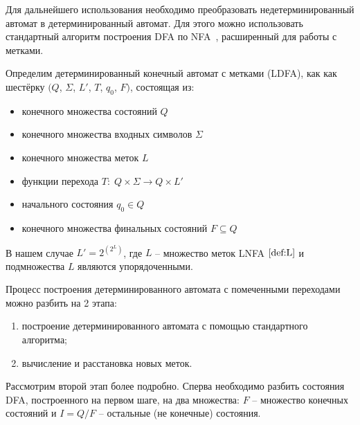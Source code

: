 Для дальнейшего использования необходимо преобразовать недетерминированный автомат в детерминированный автомат. Для этого можно использовать стандартный алгоритм построения DFA по NFA~\cite{DrgBook}, расширенный для работы с метками.

Определим детерминированный конечный автомат с метками (LDFA), как как шестёрку $(Q$, $\Sigma$, $L'$, $T$, $q_0$, $F)$, состоящая из:
\begin{itemize}
	\item конечного множества состояний $Q$ 
	\item конечного множества входных символов $\Sigma$ 
	\item конечного множества меток $L$ 
	\item функции перехода $T: \; Q \times \Sigma \rightarrow Q \times L'$
	\item начального состояния $q_0 \in Q$
	\item конечного множества финальных состояний $F \subseteq Q$ 
\end{itemize}

В нашем случае $L' = 2^{(2^L)}$, где $L$ -- множество меток LNFA $\eqref{def:L}$ и подмножества $L$ являются упорядоченными.

Процесс построения детерминированного автомата с помеченными переходами можно разбить на 2 этапа:
\begin{enumerate}
	\item построение детерминированного автомата с помощью стандартного алгоритма;
	\item вычисление и расстановка новых меток.
\end{enumerate}

Рассмотрим второй этап более подробно. Сперва необходимо разбить состояния DFA, построенного на первом шаге, на два множества: $F$ -- множество конечных состояний и $I = Q/F$ -- остальные (не конечные) состояния. 

